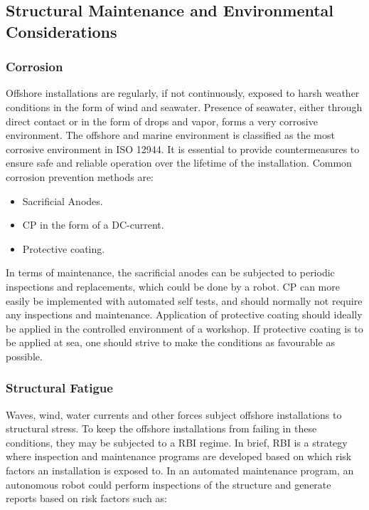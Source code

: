 \subsection{Structural Maintenance and Environmental Considerations}

\subsubsection{Corrosion}

Offshore installations are regularly, if not continuously, exposed to harsh weather conditions in the form of wind and seawater. Presence of seawater, either through direct contact or in the form of drops and vapor, forms a very corrosive environment. The offshore and marine environment is classified as the most corrosive environment in ISO 12944\cite{ElReedy2012383}. It is essential to provide countermeasures to ensure safe and reliable operation over the lifetime of the installation. Common corrosion prevention methods are\cite{ElReedy2012383}:

\begin{itemize}
	\item Sacrificial Anodes.
	\item \ac{CP} in the form of a DC-current.
	\item Protective coating.
\end{itemize} 

In terms of maintenance, the sacrificial anodes can be subjected to periodic inspections and replacements, which could be done by a robot. \ac{CP} can more easily be implemented with automated self tests, and should normally not require any inspections and maintenance\cite{ElReedy2012383}. Application of protective coating should ideally be applied in the controlled environment of a workshop. If protective coating is to be applied at sea, one should strive to make the conditions as favourable as possible. 

\subsubsection{Structural Fatigue}

Waves, wind, water currents and other forces subject offshore installations to structural stress. To keep the offshore installations from failing in these conditions, they may be subjected to a \ac{RBI} regime. In brief, \ac{RBI} is a strategy where inspection and maintenance programs are developed based on which risk factors an installation is exposed to. In an automated maintenance program, an autonomous robot could perform inspections of the structure and generate reports based on risk factors such as\cite{ElReedy2012563}:

